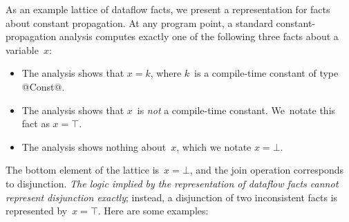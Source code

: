 \documentclass[blockstyle,preprint,nocopyrightspace]{sigplanconf}
\newcommand{\authornote}[1]{{\em #1}}
\def\authornote#1{\unskip\relax}
\newcommand{\simon}[1]{\authornote{SLPJ: #1}}
\newcommand{\norman}[1]{\authornote{NR: #1}}
\let\remark\norman
\begin{document}
As an example lattice of dataflow facts, 
we present a representation for facts about constant propagation.
At any program point, a standard constant-propagation analysis
computes exactly one of the following three
facts about a variable~$x$:
\remark{We're a bit careless about distinguishing
 ``fact'' and ``assertion'', but the general idea is that an
 ``assertion'' is God's truth in logic and a ``fact'' is an
 approximation or representation of an assertion.
Perhaps future revisions will clarify.}
\begin{itemize}
\item
The analysis shows that
$x = k$, where $k$~is a compile-time constant of type @Const@.
\item
The analysis shows that $x$~is \emph{not} a compile-time constant.
We~notate this fact as $x = \top$.
\item
The analysis shows nothing about~$x$, which we notate $x=\bot$.
\end{itemize}
The bottom element of the lattice is~$x=\bot$, and
the join operation corresponds to disjunction.
\emph{The logic implied by the
representation of dataflow facts cannot represent disjunction
exactly}; instead, a
disjunction of two inconsistent facts is represented by~$x=\top$.
\simon{At this point it's very unclear why one should focus on 
disjunction here.  Why not conjunction, or something else?
I tried to fix that in my rewrite.}
Here are some examples:
\end{document}
